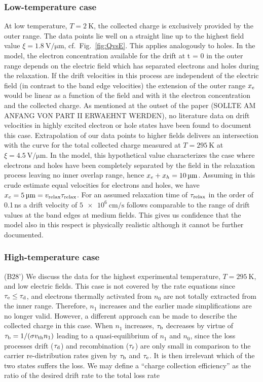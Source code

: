 \subsubsection{Low-temperature case}

At low temperature, $T = \SI{2}{\kelvin}$, the collected charge is exclusively provided by the outer range. 
The data points lie well on a straight line up to the highest field value $\xi = \SI{1.8}{\volt/\um}$, cf.~Fig.~\ref{fig:QvsE}. 
This applies analogously to holes. 
In the model, the electron concentration available for the drift at t = 0 in the outer range depends on the electric field which has separated electrons and holes during the relaxation. 
If the drift velocities in this process are independent of the electric field (in contrast to the band edge velocities)
 the extension of the outer range $x_{\mathnormal{e}}$ would be linear as a function of the field and with it the electron concentration and the collected charge. 
As mentioned at the outset of the paper (SOLLTE AM ANFANG VON PART II ERWAEHNT WERDEN), no literature data on drift velocities in highly excited electron or hole states have been found to document this case. 
Extrapolation of our data points to higher fields delivers an intersection with the curve for the total collected charge measured at $T = \SI{295}{\kelvin}$ at $\xi = \SI{4.5}{\volt/\um}$. 
In the model, this hypothetical value characterizes the case where electrons and holes have been completely separated by the field in the relaxation process leaving no inner overlap range,
 hence $x_\e + x_\h = \SI{10}{\um}$. 
Assuming in this crude estimate equal velocities for electrons and holes, we have $x_\e = \SI{5}{\um} = \vrelax \taurelax$. 
For an assumed relaxation time of $\tau_\textrm{relax}$ in the order of 0.1\,ns a drift velocity of $\SI{5e6}{\cm/\s}$ follows comparable to the range of drift values at the band edges at medium fields. 
This gives us confidence that the model also in this respect is physically realistic although it cannot be further documented.

\subsubsection{High-temperature case}

{\color{red}(B28')}
We discuss the data for the highest experimental temperature, $T = \SI{295}{\kelvin}$, and low electric fields. 
This case is not covered by the rate equations since $\tau_\textrm{e} \leq \tau_{\textrm{d}}$, and electrons thermally activated from $n_0$ are not totally extracted from the inner range. 
Therefore, $n_1$ increases and the earlier made simplifications are no longer valid. 
However, a different approach can be made to describe the collected charge in this case.
When $n_1$ increases, $\tau_{\textrm{b}}$ decreases by virtue of $\tau_{\textrm{b}} = 1/ (\sigma \mathnormal{v}_{\textrm{th}} n_1)$ leading to a quasi-equilibrium of $n_1$ and $n_0$,
 since the loss processes drift ($\tau_{\textrm{d}}$) and recombination ($\tau_\textrm{r}$) are only small in comparison to the carrier re-distribution rates given by $\tau_{\textrm{b}}$ and $\tau_\textrm{e}$. 
It is then irrelevant which of the two states suffers the loss. 
We may define a “charge collection efficiency” as the ratio of the desired drift rate to the total loss rate

